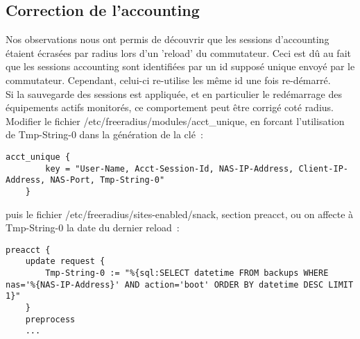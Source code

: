 \subsection{Correction de l'accounting}

Nos observations nous ont permis de découvrir que les sessions d'accounting étaient écrasées par radius lors d'un 'reload' du commutateur. Ceci est dû au fait que les sessions accounting sont identifiées par un id supposé unique envoyé par le commutateur. Cependant, celui-ci re-utilise les même id une fois re-démarré.\\
Si la sauvegarde des sessions est appliquée, et en particulier le redémarrage des équipements actifs monitorés, ce comportement peut être corrigé coté radius.\\

Modifier le fichier /etc/freeradius/modules/acct\_unique, en forcant l'utilisation de Tmp-String-0 dans la génération de la clé~:
\begin{lstlisting}
acct_unique {
        key = "User-Name, Acct-Session-Id, NAS-IP-Address, Client-IP-Address, NAS-Port, Tmp-String-0"
	}
\end{lstlisting}

puis le fichier /etc/freeradius/sites-enabled/snack, section preacct, ou on affecte à Tmp-String-0 la date du dernier reload~:
\begin{lstlisting}
preacct {
	update request {
		Tmp-String-0 := "%{sql:SELECT datetime FROM backups WHERE nas='%{NAS-IP-Address}' AND action='boot' ORDER BY datetime DESC LIMIT 1}"
	}
	preprocess
	...
\end{lstlisting}


